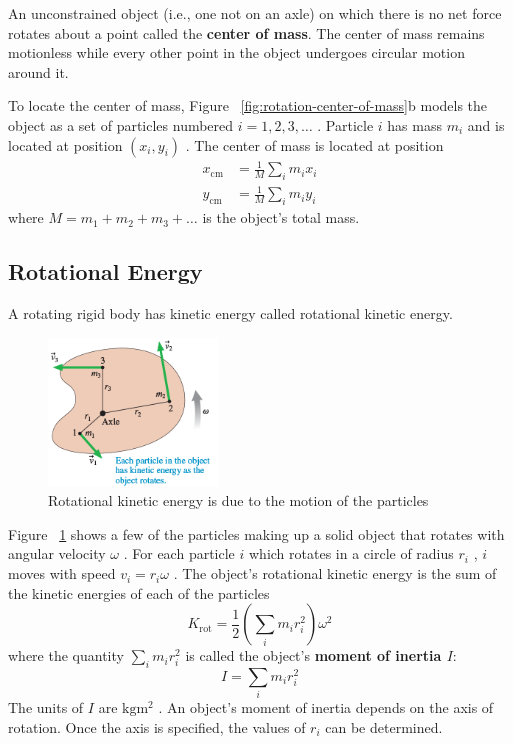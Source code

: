 An unconstrained object (i.e., one not on an axle) on which there is no
net force rotates about a point called the \textbf{center of mass}.  The
center of mass remains motionless while every other point in the object
undergoes circular motion around it.

To locate the center of mass, Figure~%
\ref{fig:rotation-center-of-mass}b models the object as a set of
particles numbered
$
    i = 1, 2, 3, \dots
$%
.  Particle
$
    i
$ has mass
$
    m_i
$ and is located at position
$
    (x_i,y_i)
$%
.  The center of mass is located at position
\begin{align}
    x_\mathrm{cm} &= \frac{1}{M} \sum_i m_ix_i \\
    y_\mathrm{cm} &= \frac{1}{M} \sum_i m_iy_i
\end{align}
where
$
    M = m_1 + m_2 + m_3 + \dots
$ is the object's total mass.

\subsection{Rotational Energy}

A rotating rigid body has kinetic energy called rotational kinetic
energy.

\begin{figure}
    \centering
    \includegraphics[width=0.4\textwidth]{../figures/rotational-kinetic-energy.png}
    \caption{Rotational kinetic energy is due to the motion of the
    particles}%
    \label{fig:rotational-kinetic-energy}
\end{figure}

Figure~%
\ref{fig:rotational-kinetic-energy} shows a few of the particles making
up a solid object that rotates with angular velocity
$
    \omega
$%
.  For each particle
$
    i
$ which rotates in a circle of radius
$
    r_i
$%
,
$
    i
$ moves with speed
$
    v_i = r_i\omega
$%
.  The object's rotational kinetic energy is the sum of the kinetic
energies of each of the particles
\begin{equation}
    K_\mathrm{rot} = \frac{1}{2}\left(\sum_i m_i r_i^2\right)\omega^2
\end{equation}
where the quantity
$
    \sum_i m_ir_i^2
$ is called the object's \textbf{moment of inertia
$
    I
$}:
\begin{equation}
    \label{eq:moment-of-intertia} I = \sum_i m_ir_i^2
\end{equation}
The units of
$
    I
$ are
$
    \unit{\kilo\gram\square\metre}
$%
.  An object's moment of inertia depends on the axis of rotation.  Once
the axis is specified, the values of
$
    r_i
$ can be determined.

